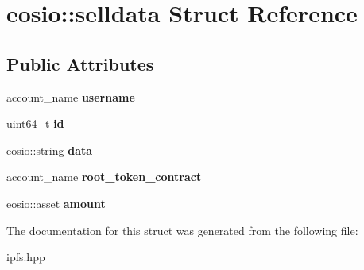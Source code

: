 \hypertarget{structeosio_1_1selldata}{}\section{eosio\+:\+:selldata Struct Reference}
\label{structeosio_1_1selldata}
\subsection*{Public Attributes}
\begin{DoxyCompactItemize}
\item 
\mbox{\label{structeosio_1_1selldata_a085edb0517574131a2e351d1cb449624}} 
account\+\_\+name {\bfseries username}
\item 
\mbox{\label{structeosio_1_1selldata_a3dc17b9e00ee3bd9391b15b06431b88d}} 
uint64\+\_\+t {\bfseries id}
\item 
\mbox{\label{structeosio_1_1selldata_a84935cf0504b03216ce22d140abf29f4}} 
eosio\+::string {\bfseries data}
\item 
\mbox{\label{structeosio_1_1selldata_a9cf265de4ab19e1ad3e7ba8bf57b0b19}} 
account\+\_\+name {\bfseries root\+\_\+token\+\_\+contract}
\item 
\mbox{\label{structeosio_1_1selldata_a4f16fa8b0c7a10bffe7ffe8f2ec7e79b}} 
eosio\+::asset {\bfseries amount}
\end{DoxyCompactItemize}


The documentation for this struct was generated from the following file\+:\begin{DoxyCompactItemize}
\item 
ipfs.\+hpp\end{DoxyCompactItemize}
